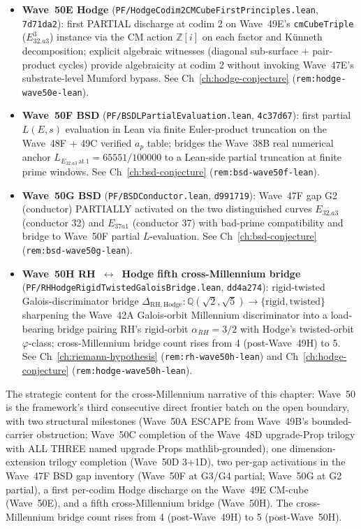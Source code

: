 \begin{remark}
\begin{itemize}
  \item \textbf{Wave~50E Hodge} (\texttt{PF/HodgeCodim2CMCubeFirstPrinciples.lean}, \texttt{7d71da2}): first PARTIAL discharge at codim 2 on Wave~49E's \texttt{cmCubeTriple} ($E_{32.a3}^3$) instance via the CM action $\mathbb{Z}[i]$ on each factor and K\"unneth decomposition; explicit algebraic witnesses (diagonal sub-surface $+$ pair-product cycles) provide algebraicity at codim 2 without invoking Wave~47E's substrate-level Mumford bypass. See Ch~\ref{ch:hodge-conjecture} (\texttt{rem:hodge-wave50e-lean}).
  \item \textbf{Wave~50F BSD} (\texttt{PF/BSDLPartialEvaluation.lean}, \texttt{4c37d67}): first partial $L(E, s)$ evaluation in Lean via finite Euler-product truncation on the Wave~48F + 49C verified $a_p$ table; bridges the Wave~38B real numerical anchor $L_{E_{32.a3}\,\mathrm{at}\,1} = 65551/100000$ to a Lean-side partial truncation at finite prime windows. See Ch~\ref{ch:bsd-conjecture} (\texttt{rem:bsd-wave50f-lean}).
  \item \textbf{Wave~50G BSD} (\texttt{PF/BSDConductor.lean}, \texttt{d991719}): Wave~47F gap G2 (conductor) PARTIALLY activated on the two distinguished curves $E_{32.a3}$ (conductor 32) and $E_{37a1}$ (conductor 37) with bad-prime compatibility and bridge to Wave~50F partial $L$-evaluation. See Ch~\ref{ch:bsd-conjecture} (\texttt{rem:bsd-wave50g-lean}).
  \item \textbf{Wave~50H RH~$\leftrightarrow$~Hodge fifth cross-Millennium bridge} (\texttt{PF/RHHodgeRigidTwistedGaloisBridge.lean}, \texttt{dd4a274}): rigid-twisted Galois-discriminator bridge $\Delta_{\mathrm{RH,Hodge}} : \mathbb{Q}(\sqrt{2}, \sqrt{5}) \to \{\mathrm{rigid}, \mathrm{twisted}\}$ sharpening the Wave~42A Galois-orbit Millennium discriminator into a load-bearing bridge pairing RH's rigid-orbit $\alpha_{RH} = 3/2$ with Hodge's twisted-orbit $\varphi$-class; cross-Millennium bridge count rises from 4 (post-Wave~49H) to 5. See Ch~\ref{ch:riemann-hypothesis} (\texttt{rem:rh-wave50h-lean}) and Ch~\ref{ch:hodge-conjecture} (\texttt{rem:hodge-wave50h-lean}).
\end{itemize}
The strategic content for the cross-Millennium narrative of this chapter: Wave~50 is the framework's third consecutive direct frontier batch on the open boundary, with two structural milestones (Wave~50A ESCAPE from Wave~49B's bounded-carrier obstruction; Wave~50C completion of the Wave~48D upgrade-Prop trilogy with ALL THREE named upgrade Props mathlib-grounded), one dimension-extension trilogy completion (Wave~50D 3+1D), two per-gap activations in the Wave~47F BSD gap inventory (Wave~50F at G3/G4 partial; Wave~50G at G2 partial), a first per-codim Hodge discharge on the Wave~49E CM-cube (Wave~50E), and a fifth cross-Millennium bridge (Wave~50H). The cross-Millennium bridge count rises from 4 (post-Wave~49H) to 5 (post-Wave~50H).


\end{remark}

